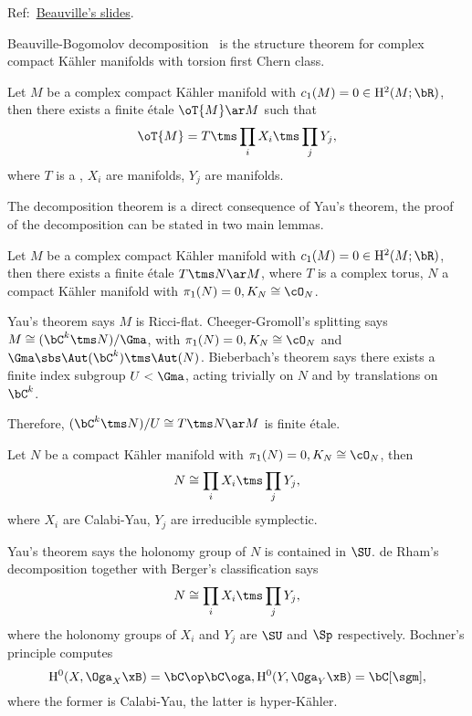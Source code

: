 \documentclass[article, a4paper, twoside]{universal}
\begin{document}
\confighead{}{}{}



Ref:~\href{https://math.unice.fr/~beauvill/conf/decomp.pdf}{Beauville's slides}.

Beauville-Bogomolov decomposition~\cite{Bogomolov1974,Beauville1983Kahler} is the structure theorem for complex compact K{\"a}hler manifolds with torsion first Chern class.

\begin{thm}
	Let $M$ be a complex compact K{\"a}hler manifold with $c_{1}(M)=0\in \mathrm{H}_{}^{2}(M;\bR)$, then there exists a finite {\'e}tale $\oT{M}\ar M$ such that
	\[
		\oT{M}=T\tms\prod_{i}X_{i}\tms\prod_{j} Y_{j},
	\]
	where $T$ is a , $X_{i}$ are  manifolds, $Y_{j}$ are  manifolds.
\end{thm}


The decomposition theorem is a direct consequence of Yau's theorem\cite{Yau1978}, the proof of the decomposition can be stated in two main lemmas.


\begin{lem}
	Let $M$ be a complex compact K{\"a}hler manifold with $c_{1}(M)=0\in \mathrm{H}_{}^{2}(M;\bR)$, then there exists a finite {\'e}tale $T\tms N\ar M$, where $T$ is a complex torus, $N$ a compact K{\"a}hler manifold with $\pi_{1}(N)=0, K_{N}\cong\cO_{N}$.
\end{lem}

\begin{prf}
	Yau's theorem says $M$ is Ricci-flat. Cheeger-Gromoll's splitting says $M\cong(\bC^{k}\tms N)/\Gma$, with $\pi_{1}(N)=0, K_{N}\cong\cO_{N}$ and $\Gma\sbs\Aut(\bC^{k})\tms\Aut(N)$. Bieberbach's theorem says there exists a finite index subgroup $U<\Gma$, acting trivially on $N$ and by translations on $\bC^{k}$.

	Therefore, $(\bC^{k}\tms N)/U\cong T\tms N\ar M$ is finite {\'e}tale.
\end{prf}

\begin{lem}
	Let $N$ be a compact K{\"a}hler manifold with $\pi_{1}(N)=0, K_{N}\cong\cO_{N}$, then
	\[
		N\cong\prod_{i}X_{i}\tms\prod_{j}Y_{j},
	\]
	where $X_{i}$ are Calabi-Yau, $Y_{j}$ are irreducible symplectic.
\end{lem}

\begin{prf}
	Yau's theorem says the holonomy group of $N$ is contained in $\SU$. de Rham's decomposition together with Berger's classification says
	\[
		N\cong\prod_{i}X_{i}\tms\prod_{j}Y_{j},
	\]
	where the holonomy groups of $X_{i}$ and $Y_{j}$ are $\SU$ and $\Sp$ respectively. Bochner's principle computes
	\[
		\mathrm{H}_{}^{0}(X,\Oga_{X}\xB)=\bC\op\bC\oga, \mathrm{H}_{}^{0}(Y,\Oga_{Y}\xB)=\bC[\sgm],
	\]
	where the former is Calabi-Yau, the latter is hyper-K{\"a}hler.
\end{prf}
\end{document}
